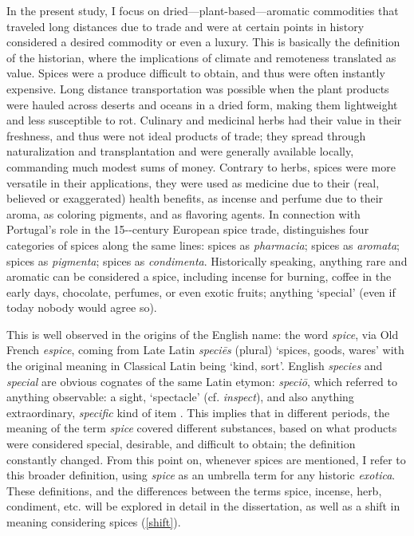 In the present study, I focus on dried---plant-based---aromatic commodities that traveled long distances due to trade and were at certain points in history considered a desired commodity or even a luxury. This is basically the definition of the historian, where the implications of climate and remoteness translated as value. Spices were a produce difficult to obtain, and thus were often instantly expensive. Long distance transportation was possible when the plant products were hauled across deserts and oceans in a dried form, making them lightweight and less susceptible to rot. Culinary and medicinal herbs had their value in their freshness, and thus were not ideal products of trade; they spread through naturalization and transplantation and were generally available locally, commanding much modest sums of money. Contrary to herbs, spices were more versatile in their applications, they were used as medicine due to their (real, believed or exaggerated) health benefits, as incense and perfume due to their aroma, as coloring pigments, and as flavoring agents. In connection with Portugal's role in the 15--century European spice trade, \textcite{halikowski_smith_portugal_2001} distinguishes four categories of spices along the same lines: spices as \textit{pharmacia}; spices as \textit{aromata}; spices as \textit{pigmenta}; spices as \textit{condimenta}. Historically speaking, anything rare and aromatic can be considered a spice, including incense for burning, coffee in the early days, chocolate, perfumes, or even exotic fruits; anything `special' (even if today nobody would agree so).

This is well observed in the origins of the English name: the word \textit{spice}, via Old French \textit{espice}, coming from Late Latin \textit{speciēs} (plural) `spices, goods, wares' with the original meaning in Classical Latin being `kind, sort'. English \textit{species} and \textit{special} are obvious cognates of the same Latin etymon: \textit{speciō}, which referred to anything observable: a sight, `spectacle' (cf. \textit{inspect}), and also anything extraordinary, \textit{specific} kind of item \autocite[1983-84]{glare_oxford_2012}. This implies that in different periods, the meaning of the term \textit{spice} covered different substances, based on what products were considered special, desirable, and difficult to obtain; the definition constantly changed. From this point on, whenever spices are mentioned, I refer to this broader definition, using \textit{spice} as an umbrella term for any historic \textit{exotica}. These definitions, and the differences between the terms spice, incense, herb, condiment, etc. will be explored in detail in the dissertation, as well as a shift in meaning considering spices (\cref{shift}).

